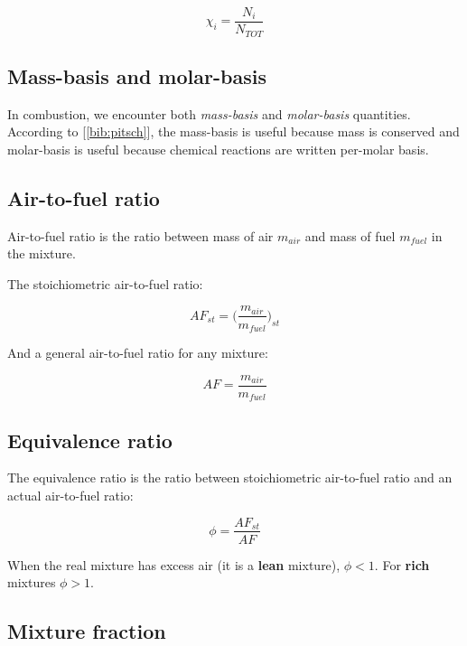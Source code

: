\documentclass[10pt,twocolumn]{article}
\begin{document}
\begin{equation}
\chi_i = \frac{N_i}{N_{TOT}}
\end{equation}

\subsection{Mass-basis and molar-basis}

In combustion, we encounter both \textit{mass-basis} and \textit{molar-basis} quantities. According to [\ref{bib:pitsch}], the mass-basis is useful because mass is conserved and molar-basis is useful because chemical reactions are written per-molar basis.

\subsection{Air-to-fuel ratio}

Air-to-fuel ratio is the ratio between mass of air $m_{air}$ and mass of fuel $m_{fuel}$ in the mixture.

The stoichiometric air-to-fuel ratio:

\begin{equation}
AF_{st} = \Big( \frac{m_{air}}{m_{fuel}} \Big)_{st}
\end{equation}

And a general air-to-fuel ratio for any mixture:

\begin{equation}
AF = \frac{m_{air}}{m_{fuel}}
\end{equation}

\subsection{Equivalence ratio}

The equivalence ratio is the ratio between stoichiometric air-to-fuel ratio and an actual air-to-fuel ratio:

\begin{equation}
\phi = \frac{AF_{st}}{AF}
\end{equation}

When the real mixture has excess air (it is a \textbf{lean} mixture), $\phi < 1$. For \textbf{rich} mixtures $\phi > 1$.

\subsection{Mixture fraction}
\end{document}

